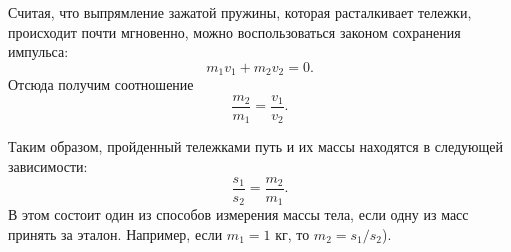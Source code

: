 \documentclass[14pt,a4paper,oneside]{extarticle}	%
\begin{document}
Считая, что выпрямление зажатой пружины, которая расталкивает тележки, происходит почти мгновенно, можно воспользоваться законом сохранения импульса:
\begin{equation}\label{newton-eq4}
m_{1}v_{1} + m_{2}v_{2} = 0.
\end{equation}
Отсюда получим соотношение
\begin{equation}\label{newton-eq5}
\frac{m_{2}}{m_{1}} = \frac{v_{1}}{v_{2}}.
\end{equation}

Таким образом, пройденный тележками путь и их массы находятся в следующей зависимости:
\begin{equation}\label{newton-eq6}
\frac{s_{1}}{s_{2}} = \frac{m_{2}}{m_{1}}.
\end{equation}
В этом состоит один из способов измерения массы тела, если одну из масс принять за эталон.
Например, если $m_{1}=1$ кг, то $m_{2}=s_1/s_2$).
\end{document}
